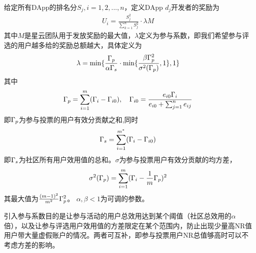 给定所有DApp的排名分$S_j,i=1,2,...,n$，定义DApp $d_j$开发者的奖励为
\begin{align}
\label{eq:distribution}
U_i = \frac{S_j^2}{\sum_{k=1}^n S_j^2}\cdot \lambda M
\end{align}
其中$M$是星云团队用于发放奖励的最大值，$\lambda $定义为参与系数，即我们希望参与评选的用户越多给的奖励总额越大，具体定义为
\begin{align}
\lambda=\min\{\frac{\Gamma_p}{\alpha \Gamma_s }\cdot \min\{\frac{\beta\Gamma_p^2 }{\sigma^2(\Gamma_p)},1\},1\}
\end{align}
其中$$\Gamma_p = \sum_{i=1}^m (\Gamma_i-\Gamma_{i0}),~~~\Gamma_{i0} = \frac{e_{i0}\Gamma_i}{e_{i0}+\sum_{j=1}^n {e_{ij}}}$$
即$\Gamma_p$为参与投票的用户有效分贡献之和,同时$$\Gamma_s = \sum_{i=1}^{m^*} (\Gamma_i-\Gamma_{i0})$$即$\Gamma_s$为社区所有用户效用值的总和。$\sigma$为参与投票用户有效分贡献的均方差，
$$ \sigma^2(\Gamma_p) = \sum_{i=1}^m (\Gamma_i-\frac{1}{m}\Gamma_p)^2 $$
其最大值为$\frac{(m-1)^2}{m^2}\Gamma_p^2$。
$\alpha,\beta<1$为可调的参数。

引入参与系数目的是让参与活动的用户总效用达到某个阈值（社区总效用的$\alpha$倍），以及让参与评选用户效用值的方差限定在某个范围内，防止出现少量高NR值用户带大量虚假账户的情况。两者可互补，即参与投票用户NR总值够高时可以不考虑方差的影响。

